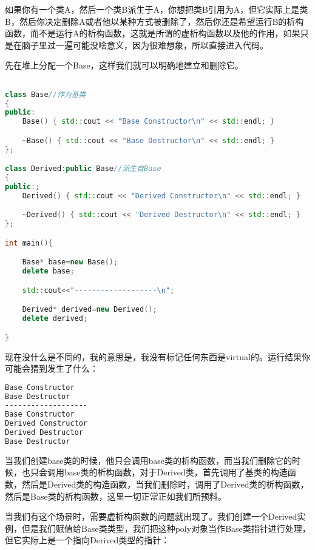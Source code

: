 如果你有一个类A，然后一个类B派生于A，你想把类B引用为A，但它实际上是类B，然后你决定删除A或者他以某种方式被删除了，然后你还是希望运行B的析构函数，而不是运行A的析构函数，这就是所谓的虚析构函数以及他的作用，如果只是在脑子里过一遍可能没啥意义，因为很难想象，所以直接进入代码。

先在堆上分配一个{\ncodestyle Base}，这样我们就可以明确地建立和删除它。

\begin{lstlisting}[language=c++]

class Base//作为基类
{
public:
    Base() { std::cout << "Base Constructor\n" << std::endl; }

    ~Base() { std::cout << "Base Destructor\n" << std::endl; }
};

class Derived:public Base//派生自Base
{
public:;
    Derived() { std::cout << "Derived Constructor\n" << std::endl; }

    ~Derived() { std::cout << "Derived Destructor\n" << std::endl; }
};

int main(){

    Base* base=new Base();
    delete base;

    std::cout<<"-------------------\n";

    Derived* derived=new Derived();
    delete derived;

}
\end{lstlisting}

现在没什么是不同的，我的意思是，我没有标记任何东西是{\ncodestyle virtual}的。运行结果你可能会猜到发生了什么：

\begin{lstlisting}[language=bash]
Base Constructor
Base Destructor
-------------------
Base Constructor
Derived Constructor
Derived Destructor
Base Destructor
\end{lstlisting}

当我们创建{\ncodestyle base}类的时候，他只会调用{\ncodestyle base}类的析构函数，而当我们删除它的时候，也只会调用{\ncodestyle base}类的析构函数，对于{\ncodestyle Derived}类，首先调用了基类的构造函数，然后是{\ncodestyle Derived}类的构造函数，当我们删除时，调用了{\ncodestyle Derive}d类的析构函数，然后是Base类的析构函数，这里一切正常正如我们所预料。

当我们有这个场景时，需要虚析构函数的问题就出现了。我们创建一个{\ncodestyle Derived}实例，但是我们赋值给{\ncodestyle Base}类类型，我们把这种{\ncodestyle poly}对象当作{\ncodestyle Base}类指针进行处理，但它实际上是一个指向{\ncodestyle Derived}类型的指针：

